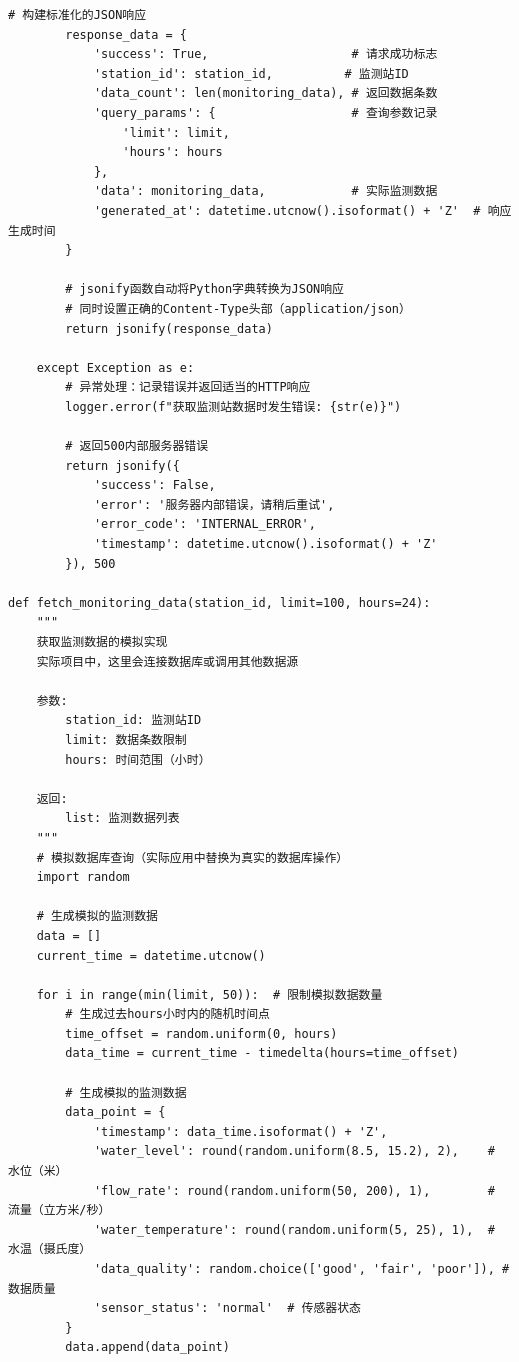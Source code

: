 \begin{lstlisting}[style=python]
        # 构建标准化的JSON响应
        response_data = {
            'success': True,                    # 请求成功标志
            'station_id': station_id,          # 监测站ID
            'data_count': len(monitoring_data), # 返回数据条数
            'query_params': {                   # 查询参数记录
                'limit': limit,
                'hours': hours
            },
            'data': monitoring_data,            # 实际监测数据
            'generated_at': datetime.utcnow().isoformat() + 'Z'  # 响应生成时间
        }
        
        # jsonify函数自动将Python字典转换为JSON响应
        # 同时设置正确的Content-Type头部（application/json）
        return jsonify(response_data)
        
    except Exception as e:
        # 异常处理：记录错误并返回适当的HTTP响应
        logger.error(f"获取监测站数据时发生错误: {str(e)}")
        
        # 返回500内部服务器错误
        return jsonify({
            'success': False,
            'error': '服务器内部错误，请稍后重试',
            'error_code': 'INTERNAL_ERROR',
            'timestamp': datetime.utcnow().isoformat() + 'Z'
        }), 500

def fetch_monitoring_data(station_id, limit=100, hours=24):
    """
    获取监测数据的模拟实现
    实际项目中，这里会连接数据库或调用其他数据源
    
    参数:
        station_id: 监测站ID
        limit: 数据条数限制
        hours: 时间范围（小时）
        
    返回:
        list: 监测数据列表
    """
    # 模拟数据库查询（实际应用中替换为真实的数据库操作）
    import random
    
    # 生成模拟的监测数据
    data = []
    current_time = datetime.utcnow()
    
    for i in range(min(limit, 50)):  # 限制模拟数据数量
        # 生成过去hours小时内的随机时间点
        time_offset = random.uniform(0, hours)
        data_time = current_time - timedelta(hours=time_offset)
        
        # 生成模拟的监测数据
        data_point = {
            'timestamp': data_time.isoformat() + 'Z',
            'water_level': round(random.uniform(8.5, 15.2), 2),    # 水位（米）
            'flow_rate': round(random.uniform(50, 200), 1),        # 流量（立方米/秒）
            'water_temperature': round(random.uniform(5, 25), 1),  # 水温（摄氏度）
            'data_quality': random.choice(['good', 'fair', 'poor']), # 数据质量
            'sensor_status': 'normal'  # 传感器状态
        }
        data.append(data_point)
    

\end{lstlisting}
